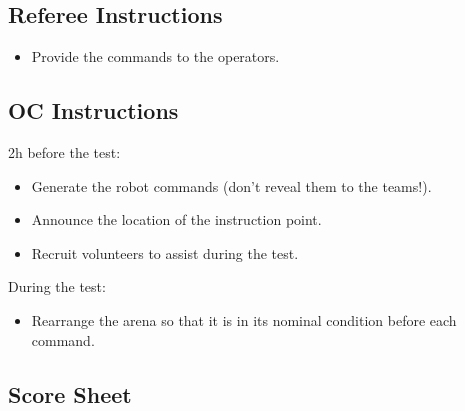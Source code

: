 \subsection*{Referee Instructions}
\begin{itemize}[nosep]
	\item Provide the commands to the operators.
\end{itemize}

\subsection*{OC Instructions}

2h before the test:
\begin{itemize}[nosep]
	\item Generate the robot commands (don't reveal them to the teams!).
	\item Announce the location of the instruction point.
	\item Recruit volunteers to assist during the test.
	\newline
\end{itemize}

\noindent During the test:
\begin{itemize}[nosep]
	\item Rearrange the arena so that it is in its nominal condition before each command.
\end{itemize}

\subsection*{Score Sheet}


